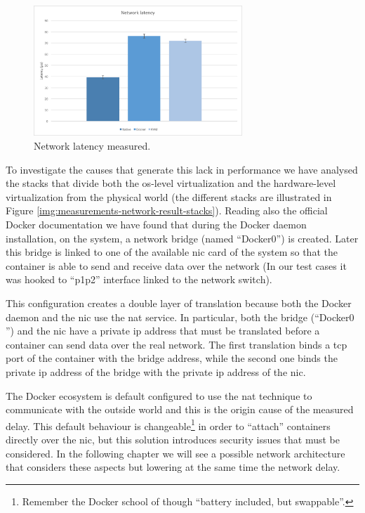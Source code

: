 \begin{figure}
	\centering{}
	\includegraphics[width=0.7\textwidth]{chapters/measurements/images/network-latency.png}
	\caption[Network - latency measured]{Network latency measured.}
	\label{img:measurements-network-results-latency}
\end{figure}

To investigate the causes that generate this lack in performance we have analysed the stacks that divide
both the \acs{os}-level virtualization and the hardware-level virtualization from the physical world (the
different stacks are illustrated in Figure \ref{img:measurements-network-result-stacks}). Reading also
the official Docker documentation we have found that during the Docker daemon installation, on the system,
a network bridge (named ``Docker$0$'') is created. Later this bridge is linked to one of the available
\ac{nic} card of the system so that the container is able to send and receive data over the network (In
our test cases it was hooked to ``p1p2'' interface linked to the network switch).

This configuration creates a double layer of translation because both the Docker daemon and the \ac{nic}
use the \ac{nat} service. In particular, both the bridge (``Docker$0$'') and the \ac{nic} have a
private \acs{ip} address that must be translated before a container can send data over the real network.
The first translation binds a \acs{tcp} port of the container with the bridge address, while the second
one binds the private \acs{ip} address of the bridge with the private \acs{ip} address of the \ac{nic}.

The Docker ecosystem is default configured to use the \ac{nat} technique to communicate with the outside
world and this is the origin cause of the measured delay. This default behaviour is changeable\footnote{
Remember the Docker school of though ``battery included, but swappable''.} in order to ``attach''
containers directly over the \ac{nic}, but this solution introduces security issues that must be
considered. In the following chapter we will see a possible network architecture that considers these
aspects but lowering at the same time the network delay.

